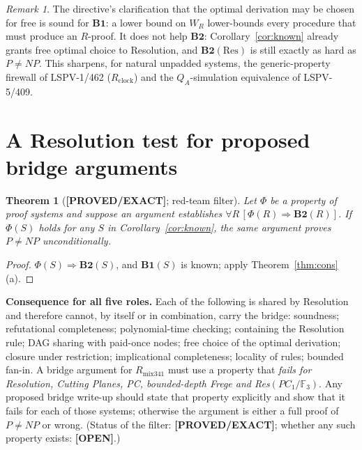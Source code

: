 \documentclass[11pt]{article}
\newtheorem{theorem}{Theorem}
\theoremstyle{remark}
\newtheorem*{remark}{Remark}
\newcommand{\status}[1]{\textbf{[#1]}}
\begin{document}
\begin{remark}
The directive's clarification that the optimal derivation may be chosen for free is sound for
$\mathbf{B1}$: a lower bound on $W_R$ lower-bounds every procedure that must produce an $R$-proof.
It does not help $\mathbf{B2}$: Corollary~\ref{cor:known} already grants free optimal choice to
Resolution, and $\mathbf{B2}(\mathrm{Res})$ is still exactly as hard as $P\ne NP$. This sharpens,
for natural unpadded systems, the generic-property firewall of LSPV-1/462 ($R_{\mathrm{clock}}$) and
the $Q_A$-simulation equivalence of LSPV-5/409.
\end{remark}

\section{A Resolution test for proposed bridge arguments}\label{sec:restest}
\begin{theorem}[\status{PROVED/EXACT}; red-team filter]\label{thm:restest}
Let $\Phi$ be a property of proof systems and suppose an argument establishes
$\forall R\,[\Phi(R)\Rightarrow\mathbf{B2}(R)]$. If $\Phi(S)$ holds for any $S$ in
Corollary~\ref{cor:known}, the same argument proves $P\neq NP$ unconditionally.
\end{theorem}
\begin{proof}
$\Phi(S)\Rightarrow\mathbf{B2}(S)$, and $\mathbf{B1}(S)$ is known; apply Theorem~\ref{thm:cons}(a).
\end{proof}
\noindent\textbf{Consequence for all five roles.} Each of the following is shared by Resolution and
therefore cannot, by itself or in combination, carry the bridge: soundness; refutational completeness;
polynomial-time checking; containing the Resolution rule; DAG sharing with paid-once nodes; free
choice of the optimal derivation; closure under restriction; implicational completeness; locality of
rules; bounded fan-in. A bridge argument for $R_{\mathrm{mix341}}$ must use a property that
\emph{fails for Resolution, Cutting Planes, PC, bounded-depth Frege and Res$(PC_1/\mathbb F_3)$}.
Any proposed bridge write-up should state that property explicitly and show that it fails for each
of those systems; otherwise the argument is either a full proof of $P\neq NP$ or wrong.
(Status of the filter: \status{PROVED/EXACT}; whether any such property exists: \status{OPEN}.)
\end{document}
